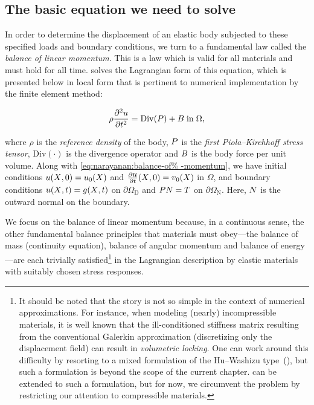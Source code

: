 \subsection{The basic equation we need to solve}

In order to determine the displacement of an elastic body subjected to
these specified loads and boundary conditions, we turn to a
fundamental law called the {\em balance of linear momentum}. This is a
law which is valid for all materials and must hold for all
time. \twist{} solves the Lagrangian form of this equation, which is
presented below in local form that is pertinent to numerical
implementation by the finite element method:

\begin{equation}
  \rho \frac{\partial^{2} \mbox{$ u$}}{\partial t^{2}} = \mathrm{Div}(\mbox{$ P$})
  + \mbox{$ B$}\; \mathrm{in}\; \Omega,
  \label{eq:narayanan:balance-of-momentum}
\end{equation}

\noindent where $\rho$ is the {\em reference density} of the body,
$\mbox{$ P$}$ is the {\em first Piola--Kirchhoff stress tensor}, $\mathrm{Div}
(\cdot)$ is the divergence operator and $\mbox{$ B$}$ is the body force per
unit volume. Along with \eqref{eq:narayanan:balance-of%
-momentum}, we have initial conditions $\mbox{$ u$}(\mbox{$ X$}, 0) = \mbox{$ u$}_{0}(\mbox{$ X$})$
and $\frac{\partial\mbox{$ u$}}{\partial t}(\mbox{$ X$}, 0) = \mbox{$ v$}_{0}(\mbox{$ X$})$ in
$\Omega$, and boundary conditions $\mbox{$ u$}(\mbox{$ X$}, t) = \mbox{$ g$}(\mbox{$ X$}, t)$ on
$\partial\Omega_{\mathrm{D}}$ and $\mbox{$ P$} \mbox{$ N$} = \mbox{$ T$}$ on
$\partial\Omega_{\mathrm{N}}$. Here, $\mbox{$ N$}$ is the outward normal
on the boundary.

We focus on the balance of linear momentum because, in a continuous
sense, the other fundamental balance principles that materials must
obey---the balance of mass (continuity equation), balance of angular
momentum and balance of energy---are each trivially
satisfied\footnote{It should be noted that the story is not
  so simple in the context of numerical approximations. For instance,
  when modeling (nearly) incompressible materials, it is well known
  that the ill-conditioned stiffness matrix resulting from the
  conventional Galerkin approximation (discretizing only the
  displacement field) can result in {\em volumetric locking}. One can
  work around this difficulty by resorting to a mixed formulation of
  the Hu--Washizu type~(\cite{SimoHughes1998}), but such a formulation
  is beyond the scope of the current chapter. \twist{} can be extended
  to such a formulation, but for now, we circumvent the problem by
  restricting our attention to compressible materials.} in the
Lagrangian description by elastic materials with suitably chosen
stress responses.

